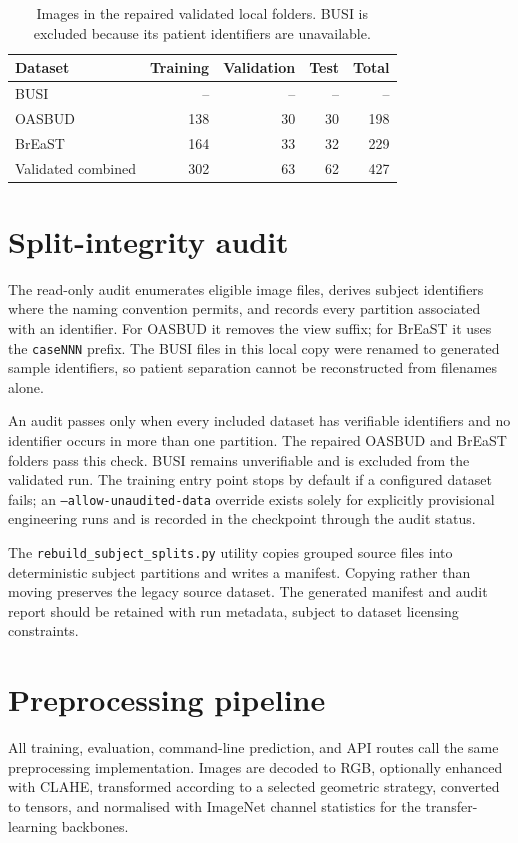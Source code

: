 \begin{table}[htbp]
\centering
\caption{Images in the repaired validated local folders. BUSI is excluded because its patient identifiers are unavailable.}
\label{tab:local_counts}
\begin{tabular}{@{}lrrrr@{}}
\toprule
\textbf{Dataset} & \textbf{Training} & \textbf{Validation} & \textbf{Test} & \textbf{Total} \\ \midrule
BUSI & -- & -- & -- & -- \\
OASBUD & 138 & 30 & 30 & 198 \\
BrEaST & 164 & 33 & 32 & 229 \\ \midrule
Validated combined & 302 & 63 & 62 & 427 \\ \bottomrule
\end{tabular}
\end{table}

\section{Split-integrity audit}
The read-only audit enumerates eligible image files, derives subject identifiers where the naming convention permits, and records every partition associated with an identifier. For OASBUD it removes the view suffix; for BrEaST it uses the \texttt{caseNNN} prefix. The BUSI files in this local copy were renamed to generated sample identifiers, so patient separation cannot be reconstructed from filenames alone.

An audit passes only when every included dataset has verifiable identifiers and no identifier occurs in more than one partition. The repaired OASBUD and BrEaST folders pass this check. BUSI remains unverifiable and is excluded from the validated run. The training entry point stops by default if a configured dataset fails; an \texttt{--allow-unaudited-data} override exists solely for explicitly provisional engineering runs and is recorded in the checkpoint through the audit status.

The \texttt{rebuild\_subject\_splits.py} utility copies grouped source files into deterministic subject partitions and writes a manifest. Copying rather than moving preserves the legacy source dataset. The generated manifest and audit report should be retained with run metadata, subject to dataset licensing constraints.

\section{Preprocessing pipeline}
All training, evaluation, command-line prediction, and API routes call the same preprocessing implementation. Images are decoded to RGB, optionally enhanced with CLAHE, transformed according to a selected geometric strategy, converted to tensors, and normalised with ImageNet channel statistics for the transfer-learning backbones.

